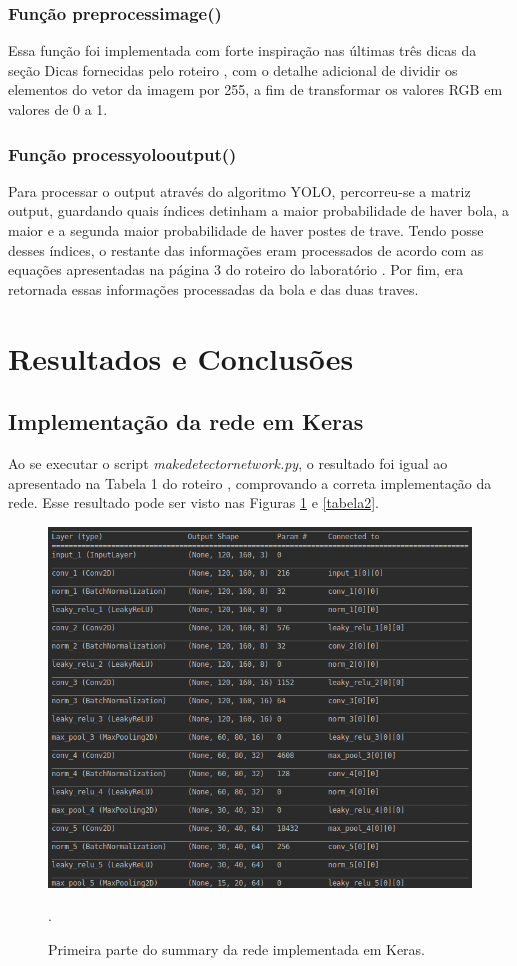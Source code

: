 \documentclass[conference]{IEEEtran}
\begin{document}
\subsubsection{Função preprocess\underline{\space}image()}
Essa função foi implementada com forte inspiração nas últimas três dicas da seção Dicas fornecidas pelo roteiro \cite{roteiro}, com o detalhe adicional de dividir os elementos do vetor da imagem por 255, a fim de transformar os valores RGB em valores de 0 a 1.

\subsubsection{Função process\underline{\space}yolo\underline{\space}output()}
Para processar o output através do algoritmo YOLO, percorreu-se a matriz output, guardando quais índices detinham a maior probabilidade de haver bola, a maior e a segunda maior probabilidade de haver postes de trave. Tendo posse desses índices, o restante das informações eram processados de acordo com as equações apresentadas na página 3 do roteiro do laboratório \cite{roteiro}. Por fim, era retornada essas informações processadas da bola e das duas traves.

\section{Resultados e Conclusões}

\subsection{Implementação da rede em Keras}
Ao se executar o script \textit{make\underline{\space}detector\underline{\space}network.py}, o resultado foi igual ao apresentado na Tabela 1 do roteiro \cite{roteiro}, comprovando a correta implementação da rede. Esse resultado pode ser visto nas Figuras \ref{tabela1} e \ref{tabela2}.

\begin{figure}[htbp]
\centering
\centerline{\includegraphics[scale=0.35]{imagens/tabela1.png}}
\caption{Primeira parte do summary da rede implementada em Keras.}.
\label{tabela1}
\end{figure}
\end{document}
